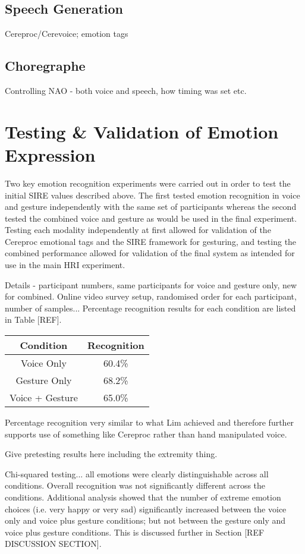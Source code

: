 \documentclass[11pt,a4paper]{report}
\begin{document}
\subsection{Speech Generation}
Cereproc/Cerevoice; emotion tags

\subsection{Choregraphe}
Controlling NAO - both voice and speech, how timing was set etc.

\section{Testing \& Validation of Emotion Expression}
Two key emotion recognition experiments were carried out in order to test the initial SIRE values described above. The first tested emotion recognition in voice and gesture independently with the same set of participants whereas the second tested the combined voice and gesture as would be used in the final experiment. Testing each modality independently at first allowed for validation of the Cereproc emotional tags and the SIRE framework for gesturing, and testing the combined performance allowed for validation of the final system as intended for use in the main HRI experiment. 

Details - participant numbers, same participants for voice and gesture only, new for combined. Online video survey setup, randomised order for each participant, number of samples... Percentage recognition results for each condition are listed in Table [REF]. 

\begin{tabular}{|c|c|}
	\hline Condition & Recognition\\ 
	\hline Voice Only & 60.4\% \\ 
	\hline Gesture Only & 68.2\% \\ 
	\hline Voice + Gesture & 65.0\% \\ 
	\hline 
\end{tabular} 

Percentage recognition very similar to what Lim achieved and therefore further supports use of something like Cereproc rather than hand manipulated voice. 

Give pretesting results here including the extremity thing.

Chi-squared testing... all emotions were clearly distinguishable across all conditions. Overall recognition was not significantly different across the conditions. Additional analysis showed that the number of extreme emotion choices (i.e. very happy or very sad) significantly increased between the voice only and voice plus gesture conditions; but not between the gesture only and voice plus gesture conditions. This is discussed further in Section [REF DISCUSSION SECTION]. 
\end{document}
